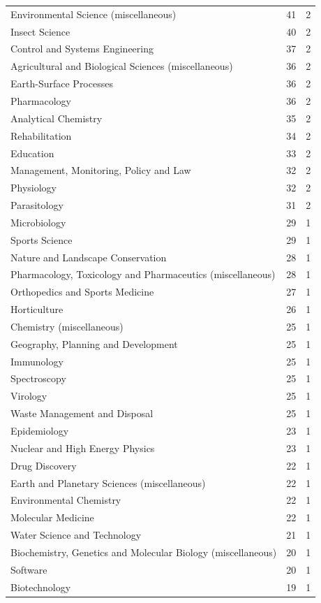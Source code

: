 \documentclass[12pt,brazil]{article}\usepackage[]{graphicx}\usepackage[]{xcolor}
\begin{document}
\begin{longtable}{lrr}
Environmental Science (miscellaneous) & 41 & 2 \\
Insect Science & 40 & 2 \\
Control and Systems Engineering & 37 & 2 \\
Agricultural and Biological Sciences (miscellaneous) & 36 & 2 \\
Earth-Surface Processes & 36 & 2 \\
Pharmacology & 36 & 2 \\
Analytical Chemistry & 35 & 2 \\
Rehabilitation & 34 & 2 \\
Education & 33 & 2 \\
Management, Monitoring, Policy and Law & 32 & 2 \\
Physiology & 32 & 2 \\
Parasitology & 31 & 2 \\
Microbiology & 29 & 1 \\
Sports Science & 29 & 1 \\
Nature and Landscape Conservation & 28 & 1 \\
Pharmacology, Toxicology and Pharmaceutics (miscellaneous) & 28 & 1 \\
Orthopedics and Sports Medicine & 27 & 1 \\
Horticulture & 26 & 1 \\
Chemistry (miscellaneous) & 25 & 1 \\
Geography, Planning and Development & 25 & 1 \\
Immunology & 25 & 1 \\
Spectroscopy & 25 & 1 \\
Virology & 25 & 1 \\
Waste Management and Disposal & 25 & 1 \\
Epidemiology & 23 & 1 \\
Nuclear and High Energy Physics & 23 & 1 \\
Drug Discovery & 22 & 1 \\
Earth and Planetary Sciences (miscellaneous) & 22 & 1 \\
Environmental Chemistry & 22 & 1 \\
Molecular Medicine & 22 & 1 \\
Water Science and Technology & 21 & 1 \\
Biochemistry, Genetics and Molecular Biology (miscellaneous) & 20 & 1 \\
Software & 20 & 1 \\
Biotechnology & 19 & 1 \\

\end{longtable}
\end{document}
